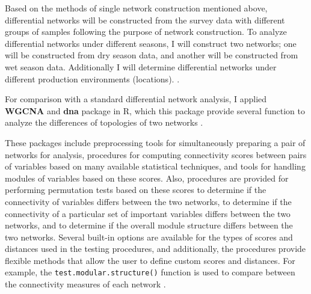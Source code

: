 Based on the methods of single network construction mentioned above, differential networks will be constructed from the survey data with different groups of samples following the purpose of network construction. To analyze differential networks under different seasons, I will construct two networks; one will be constructed from dry season data, and another will be constructed from wet season data. Additionally I will determine differential networks under different production environments (locations).
.

For comparison with a standard differential network analysis, I applied \textbf{WGCNA}  and \textbf{dna}  package in R, which this package provide several function to analyze the differences of topologies of two networks . 


These packages include preprocessing tools for simultaneously preparing a pair of networks for analysis, procedures for computing connectivity scores between pairs of variables based on many available statistical techniques, and tools for handling modules of variables based on these scores. Also, procedures are provided for performing permutation tests based on these scores to determine if the connectivity of variables differs between the two networks, to determine if the connectivity of a particular set of important variables differs between the two networks, and to determine if the overall module structure differs between the two networks. Several built-in options are available for the types of scores and distances used in the testing procedures, and additionally, the procedures provide flexible methods that allow the user to define custom scores and distances. For example, the \texttt{test.modular.structure()} function is used to compare between the connectivity measures of each network . 



 

